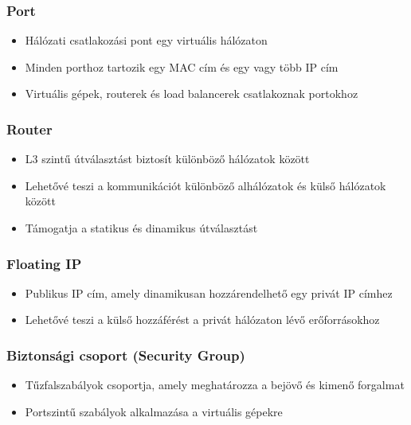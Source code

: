 \documentclass[a4paper,12pt]{article}
\begin{document}
    \subsubsection{Port}

    \begin{itemize}
        \item Hálózati csatlakozási pont egy virtuális hálózaton
        \item Minden porthoz tartozik egy MAC cím és egy vagy több IP cím
        \item Virtuális gépek, routerek és load balancerek csatlakoznak portokhoz
    \end{itemize}

    \subsubsection{Router}

    \begin{itemize}
        \item L3 szintű útválasztást biztosít különböző hálózatok között
        \item Lehetővé teszi a kommunikációt különböző alhálózatok és külső hálózatok között
        \item Támogatja a statikus és dinamikus útválasztást
    \end{itemize}

    \subsubsection{Floating IP}

    \begin{itemize}
        \item Publikus IP cím, amely dinamikusan hozzárendelhető egy privát IP címhez
        \item Lehetővé teszi a külső hozzáférést a privát hálózaton lévő erőforrásokhoz
    \end{itemize}

    \subsubsection{Biztonsági csoport (Security Group)}

    \begin{itemize}
        \item Tűzfalszabályok csoportja, amely meghatározza a bejövő és kimenő forgalmat
        \item Portszintű szabályok alkalmazása a virtuális gépekre
    \end{itemize}
\end{document}
